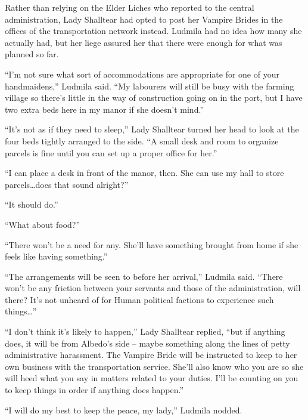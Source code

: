 Rather than relying on the Elder Liches who reported to the central administration, Lady Shalltear had opted to post her Vampire Brides in the offices of the transportation network instead. Ludmila had no idea how many she actually had, but her liege assured her that there were enough for what was planned so far.

 

“I’m not sure what sort of accommodations are appropriate for one of your handmaidens,” Ludmila said. “My labourers will still be busy with the farming village so there’s little in the way of construction going on in the port, but I have two extra beds here in my manor if she doesn’t mind.”

 

“It’s not as if they need to sleep,” Lady Shalltear turned her head to look at the four beds tightly arranged to the side. “A small desk and room to organize parcels is fine until you can set up a proper office for her.”

 

“I can place a desk in front of the manor, then. She can use my hall to store parcels…does that sound alright?”

 

“It should do.”

 

“What about food?”

 

“There won’t be a need for any. She’ll have something brought from home if she feels like having something.”

 

“The arrangements will be seen to before her arrival,” Ludmila said. “There won’t be any friction between your servants and those of the administration, will there? It’s not unheard of for Human political factions to experience such things…”

 

“I don’t think it’s likely to happen,” Lady Shalltear replied, “but if anything does, it will be from Albedo’s side – maybe something along the lines of petty administrative harassment. The Vampire Bride will be instructed to keep to her own business with the transportation service. She’ll also know who you are so she will heed what you say in matters related to your duties. I’ll be counting on you to keep things in order if anything does happen.”

 

“I will do my best to keep the peace, my lady,” Ludmila nodded.

